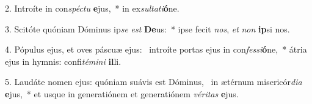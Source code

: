2. Introíte in con\textit{spéc}\textit{tu} \textbf{e}jus,~*  in ex\textit{sul}\textit{ta}\textit{ti}\textbf{ó}ne.\

3. Scitóte quóniam Dóminus ip\textit{se} \textit{est} \textbf{De}us:~*  ipse fecit \textit{nos}, \textit{et} \textit{non} \textbf{ip}si nos.\

4. Pópulus ejus, et oves páscuæ ejus: \dag\  introíte portas ejus in con\textit{fes}\textit{si}\textbf{ó}ne,~*  átria ejus in hymnis: confi\textit{té}\textit{mi}\textit{ni} \textbf{il}li.\

5. Laudáte nomen ejus: quóniam suávis est Dóminus, \dag\  in ætérnum misericór\textit{di}\textit{a} \textbf{e}jus,~*  et usque in generatiónem et generatiónem \textit{vé}\textit{ri}\textit{tas} \textbf{e}jus.\

